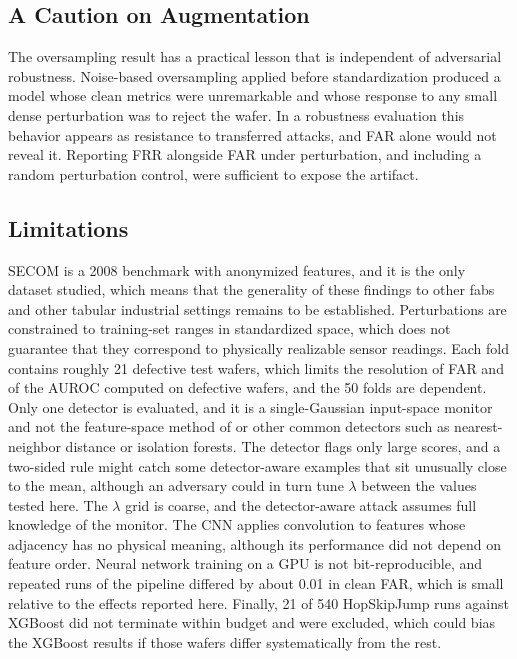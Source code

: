 \documentclass[preprint,12pt,authoryear]{elsarticle}
\begin{document}
\subsection{A Caution on Augmentation}
The oversampling result has a practical lesson that is independent of adversarial robustness. Noise-based oversampling applied before standardization produced a model whose clean metrics were unremarkable and whose response to any small dense perturbation was to reject the wafer. In a robustness evaluation this behavior appears as resistance to transferred attacks, and FAR alone would not reveal it. Reporting FRR alongside FAR under perturbation, and including a random perturbation control, were sufficient to expose the artifact.

\subsection{Limitations}
SECOM is a 2008 benchmark with anonymized features, and it is the only dataset studied, which means that the generality of these findings to other fabs and other tabular industrial settings remains to be established. Perturbations are constrained to training-set ranges in standardized space, which does not guarantee that they correspond to physically realizable sensor readings. Each fold contains roughly 21 defective test wafers, which limits the resolution of FAR and of the AUROC computed on defective wafers, and the 50 folds are dependent. Only one detector is evaluated, and it is a single-Gaussian input-space monitor and not the feature-space method of \citet{lee2018mahal} or other common detectors such as nearest-neighbor distance or isolation forests. The detector flags only large scores, and a two-sided rule might catch some detector-aware examples that sit unusually close to the mean, although an adversary could in turn tune $\lambda$ between the values tested here. The $\lambda$ grid is coarse, and the detector-aware attack assumes full knowledge of the monitor. The CNN applies convolution to features whose adjacency has no physical meaning, although its performance did not depend on feature order. Neural network training on a GPU is not bit-reproducible, and repeated runs of the pipeline differed by about 0.01 in clean FAR, which is small relative to the effects reported here. Finally, 21 of 540 HopSkipJump runs against XGBoost did not terminate within budget and were excluded, which could bias the XGBoost results if those wafers differ systematically from the rest.
\end{document}
